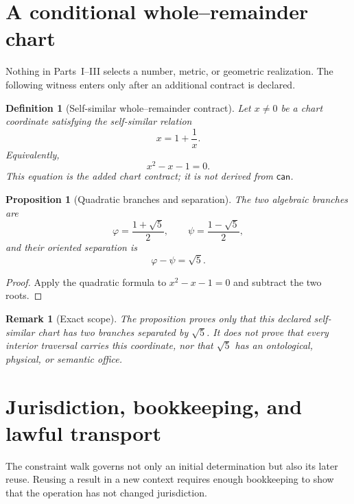 \documentclass[11pt,letterpaper]{article}
\theoremstyle{constraintstyle}
\newtheorem{proposition}[theorem]{Proposition}
\newtheorem{definition}[theorem]{Definition}
\newtheorem{remark}[theorem]{Remark}
\newcommand{\Can}{\mathsf{can}}
\newcommand{\PhiG}{\varphi}
\newcommand{\PsiG}{\psi}
\begin{document}
\section{A conditional whole--remainder chart}\label{sec:root5}

Nothing in Parts~I--III selects a number, metric, or geometric realization.  The following witness enters only after an additional contract is declared.

\begin{definition}[Self-similar whole--remainder contract]
Let $x\ne0$ be a chart coordinate satisfying the self-similar relation
\[
x=1+\frac1x.
\]
Equivalently,
\[
x^2-x-1=0.
\]
This equation is the added chart contract; it is not derived from $\Can$.
\end{definition}

\begin{proposition}[Quadratic branches and separation]\label{prop:root5}
The two algebraic branches are
\[
\PhiG=\frac{1+\sqrt5}{2},
\qquad
\PsiG=\frac{1-\sqrt5}{2},
\]
and their oriented separation is
\[
\PhiG-\PsiG=\sqrt5.
\]
\end{proposition}

\begin{proof}
Apply the quadratic formula to $x^2-x-1=0$ and subtract the two roots.
\end{proof}

\begin{remark}[Exact scope]
The proposition proves only that this declared self-similar chart has two branches separated by $\sqrt5$.  It does not prove that every interior traversal carries this coordinate, nor that $\sqrt5$ has an ontological, physical, or semantic office.
\end{remark}

\section{Jurisdiction, bookkeeping, and lawful transport}\label{sec:transport}

The constraint walk governs not only an initial determination but also its later reuse.  Reusing a result in a new context requires enough bookkeeping to show that the operation has not changed jurisdiction.
\end{document}

